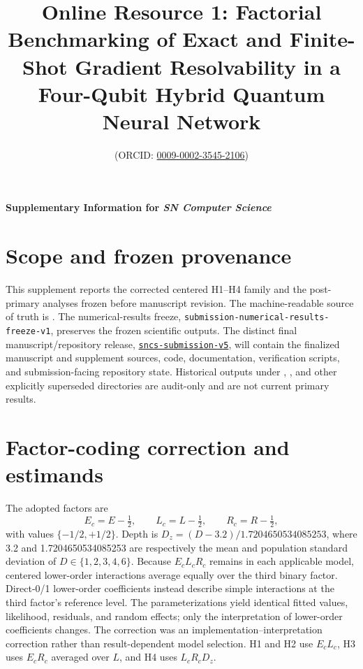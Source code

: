 \documentclass[pdflatex,sn-basic,Numbered]{sn-jnl}
\begin{document}
\title{Online Resource 1: Factorial Benchmarking of Exact and Finite-Shot Gradient Resolvability in a Four-Qubit Hybrid Quantum Neural Network}
\author*[1]{  (ORCID: \href{https://orcid.org/0009-0002-3545-2106}{0009-0002-3545-2106})}
\maketitle

\begin{center}
\textbf{Supplementary Information for \textit{SN Computer Science}}
\end{center}

\section{Scope and frozen provenance}

This supplement reports the corrected centered H1--H4 family and the post-primary analyses frozen before manuscript revision. The machine-readable source of truth is . The numerical-results freeze, \nolinkurl{submission-numerical-results-freeze-v1}, preserves the frozen scientific outputs. The distinct final manuscript/repository release, \href{https://github.com/Brandon-Shen/few-qubit-qnn-snr/releases/tag/sncs-submission-v5}{\texttt{sncs-submission-v5}}, will contain the finalized manuscript and supplement sources, code, documentation, verification scripts, and submission-facing repository state. Historical outputs under , , and other explicitly superseded directories are audit-only and are not current primary results.

\section{Factor-coding correction and estimands}

The adopted factors are
\[
E_c=E-\tfrac12,\qquad L_c=L-\tfrac12,\qquad R_c=R-\tfrac12,
\]
with values $\{-1/2,+1/2\}$. Depth is $D_z=(D-3.2)/1.7204650534085253$, where 3.2 and 1.7204650534085253 are respectively the mean and population standard deviation of $D\in\{1,2,3,4,6\}$. Because $E_cL_cR_c$ remains in each applicable model, centered lower-order interactions average equally over the third binary factor. Direct-0/1 lower-order coefficients instead describe simple interactions at the third factor's reference level. The parameterizations yield identical fitted values, likelihood, residuals, and random effects; only the interpretation of lower-order coefficients changes. The correction was an implementation--interpretation correction rather than result-dependent model selection. H1 and H2 use $E_cL_c$, H3 uses $E_cR_c$ averaged over $L$, and H4 uses $L_cR_cD_z$.
\end{document}
